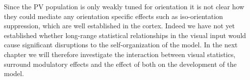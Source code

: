 Since the PV population is only weakly tuned for orientation it is not
clear how they could mediate any orientation specific effects such as
iso-orientation suppression, which are well established in the
cortex. Indeed we have not yet established whether long-range
statistical relationships in the visual input would cause significant
disruptions to the self-organization of the model. In the next chapter
we will therefore investigate the interaction between visual
statistics, surround modulatory effects and the effect of both on the
development of the model.
